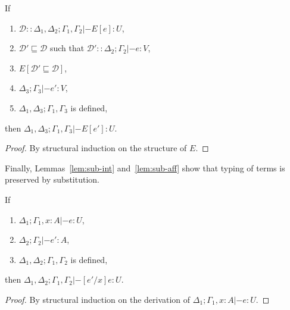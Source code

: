 
\begin{lemma}\label{lem:replacement}
  If 
  \begin{enumerate}
  \item $\mathcal{D} :: \Delta_1,\Delta_2;\Gamma_1,\Gamma_2 |- E[e] : U$,
  \item $\mathcal{D}' \sqsubseteq \mathcal{D}$ such that $\mathcal{D}' :: \Delta_2; \Gamma_2 |- e : V$,
  \item $E[\mathcal{D}' \sqsubseteq \mathcal{D}]$,
  \item $\Delta_3;\Gamma_3 |- e' : V$,
  \item $\Delta_1,\Delta_3;\Gamma_1,\Gamma_3$ is defined,
  \end{enumerate}
  then $\Delta_1,\Delta_3;\Gamma_1,\Gamma_3 |- E[e'] : U$.
  \begin{proof}
    By structural induction on the structure of $E$.
  \end{proof}  
\end{lemma}

Finally, Lemmas~\ref{lem:sub-int} and~\ref{lem:sub-aff} show that typing of
terms is preserved by substitution.

\begin{lemma}\label{lem:sub-int}
  If
  \begin{enumerate}
  \item $\Delta_1; \Gamma_1, x : A |- e : U$,
  \item $\Delta_2; \Gamma_2 |- e' : A$,
  \item $\Delta_1,\Delta_2 ; \Gamma_1,\Gamma_2$ is defined,
  \end{enumerate}
  then $\Delta_1,\Delta_2; \Gamma_1,\Gamma_2 |- [e'/x]e : U$.
  \begin{proof}
    By structural induction on the derivation of $\Delta_1; \Gamma_1, x : A |- e : U$.
  \end{proof}
\end{lemma}


